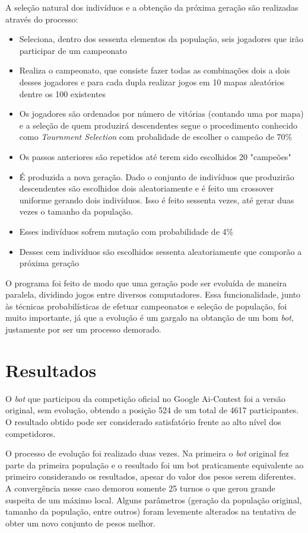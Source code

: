 \documentclass[a4paper,titlepage,11pt]{article}
\begin{document}
A seleção natural dos indivíduos e a obtenção da próxima geração são realizadas através do processo:
\begin{itemize}
	\item Seleciona, dentro dos sessenta elementos da população, seis jogadores que irão participar de um campeonato
	\item Realiza o campeonato, que consiste fazer todas as combinações dois a dois desses jogadores e para cada dupla realizar jogos em 10 mapas aleatórios dentre os 100 existentes 
	\item Os jogadores são ordenados por número de vitórias (contando uma por mapa) e a seleção de quem produzirá descendentes segue o procedimento conhecido como {\em Tournment Selection} com probalidade de escolher o campeão de 70\%
	\item Os passos anteriores são repetidos até terem sido escolhidos 20 "campeões"
	\item É produzida a nova geração. Dado o conjunto de indivíduos que produzirão descendentes são escolhidos dois aleatoriamente e é feito um crossover uniforme gerando dois indivíduos. Isso é feito sessenta vezes, até gerar duas vezes o tamanho da população. 
	\item Esses indivíduos sofrem mutação com probabilidade de 4\%
	\item Desses cem indivíduos são escolhidos sessenta aleatoriamente que comporão a próxima geração
\end{itemize}

O programa foi feito de modo que uma geração pode ser evoluída de maneira paralela, dividindo jogos entre diversos computadores. Essa funcionalidade, junto às técnicas probabilísticas de efetuar campeonatos e seleção de população, foi muito importante, já que a evolução é um gargalo na obtanção de um bom {\em bot}, justamente por ser um processo demorado.

\section{Resultados}
O {\em bot} que participou da competição oficial no Google Ai-Contest foi a versão original, sem evolução, obtendo a posição 524 de um total de 4617 participantes. O resultado obtido pode ser considerado satisfatório frente ao alto nível dos competidores.

O processo de evolução foi realizado duas vezes. Na primeira o {\em bot} original fez parte da primeira população e o resultado foi um bot praticamente equivalente ao primeiro considerando os resultados, apesar do valor dos pesos serem diferentes. A convergência nesse caso demorou somente 25 turnos o que gerou grande suspeita de um máximo local. Alguns parâmetros (geração da população original, tamanho da população, entre outros) foram levemente alterados na tentativa de obter um novo conjunto de pesos melhor.
\end{document}
